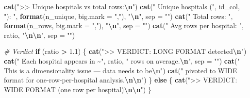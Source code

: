 \documentclass[
]{article}
\newenvironment{Shaded}{\begin{snugshade}}{\end{snugshade}}
\newcommand{\AttributeTok}[1]{\textcolor[rgb]{0.13,0.29,0.53}{#1}}
\newcommand{\CommentTok}[1]{\textcolor[rgb]{0.56,0.35,0.01}{\textit{#1}}}
\newcommand{\ControlFlowTok}[1]{\textcolor[rgb]{0.13,0.29,0.53}{\textbf{#1}}}
\newcommand{\FloatTok}[1]{\textcolor[rgb]{0.00,0.00,0.81}{#1}}
\newcommand{\FunctionTok}[1]{\textcolor[rgb]{0.13,0.29,0.53}{\textbf{#1}}}
\newcommand{\NormalTok}[1]{#1}
\newcommand{\SpecialCharTok}[1]{\textcolor[rgb]{0.81,0.36,0.00}{\textbf{#1}}}
\newcommand{\StringTok}[1]{\textcolor[rgb]{0.31,0.60,0.02}{#1}}
\begin{document}
\begin{Shaded}
\begin{Highlighting}[]
    \FunctionTok{cat}\NormalTok{(}\StringTok{"\textgreater{}\textgreater{} Unique hospitals vs total rows:}\SpecialCharTok{\textbackslash{}n}\StringTok{"}\NormalTok{)}
    \FunctionTok{cat}\NormalTok{(}\StringTok{"   Unique hospitals ("}\NormalTok{, id\_col, }\StringTok{"): "}\NormalTok{, }
        \FunctionTok{format}\NormalTok{(n\_unique, }\AttributeTok{big.mark =} \StringTok{","}\NormalTok{), }\StringTok{"}\SpecialCharTok{\textbackslash{}n}\StringTok{"}\NormalTok{, }\AttributeTok{sep =} \StringTok{""}\NormalTok{)}
    \FunctionTok{cat}\NormalTok{(}\StringTok{"   Total rows:                    "}\NormalTok{, }
        \FunctionTok{format}\NormalTok{(n\_rows, }\AttributeTok{big.mark =} \StringTok{","}\NormalTok{), }\StringTok{"}\SpecialCharTok{\textbackslash{}n}\StringTok{"}\NormalTok{, }\AttributeTok{sep =} \StringTok{""}\NormalTok{)}
    \FunctionTok{cat}\NormalTok{(}\StringTok{"   Avg rows per hospital:         "}\NormalTok{, ratio, }\StringTok{"}\SpecialCharTok{\textbackslash{}n\textbackslash{}n}\StringTok{"}\NormalTok{, }\AttributeTok{sep =} \StringTok{""}\NormalTok{)}
    
    \CommentTok{\# Verdict}
    \ControlFlowTok{if}\NormalTok{ (ratio }\SpecialCharTok{\textgreater{}} \FloatTok{1.1}\NormalTok{) \{}
        \FunctionTok{cat}\NormalTok{(}\StringTok{"\textgreater{}\textgreater{} VERDICT: LONG FORMAT detected}\SpecialCharTok{\textbackslash{}n}\StringTok{"}\NormalTok{)}
        \FunctionTok{cat}\NormalTok{(}\StringTok{"   Each hospital appears in \textasciitilde{}"}\NormalTok{, ratio, }
            \StringTok{" rows on average.}\SpecialCharTok{\textbackslash{}n}\StringTok{"}\NormalTok{, }\AttributeTok{sep =} \StringTok{""}\NormalTok{)}
        \FunctionTok{cat}\NormalTok{(}\StringTok{"   This is a dimensionality issue — data needs to be}\SpecialCharTok{\textbackslash{}n}\StringTok{"}\NormalTok{)}
        \FunctionTok{cat}\NormalTok{(}\StringTok{"   pivoted to WIDE format for one{-}row{-}per{-}hospital analysis.}\SpecialCharTok{\textbackslash{}n\textbackslash{}n}\StringTok{"}\NormalTok{)}
\NormalTok{    \} }\ControlFlowTok{else}\NormalTok{ \{}
        \FunctionTok{cat}\NormalTok{(}\StringTok{"\textgreater{}\textgreater{} VERDICT: WIDE FORMAT (one row per hospital)}\SpecialCharTok{\textbackslash{}n\textbackslash{}n}\StringTok{"}\NormalTok{)}
\NormalTok{    \}}
    

\end{Highlighting}
\end{Shaded}
\end{document}
